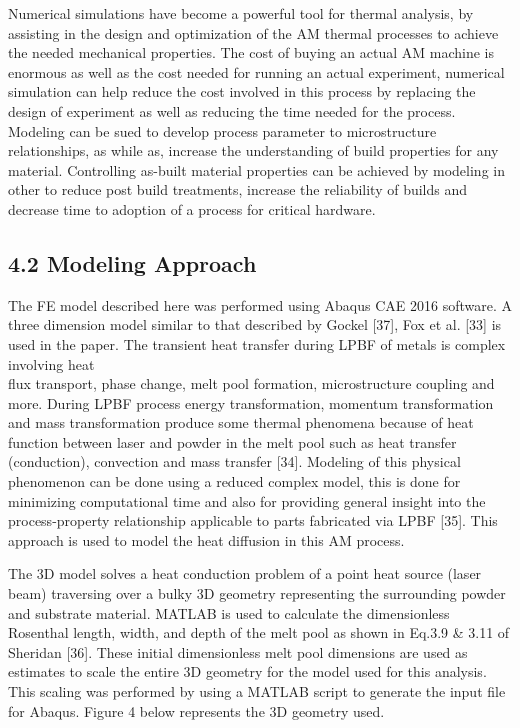 \documentclass[10pt]{article}
\begin{document}
Numerical simulations have become a powerful tool for thermal analysis, by assisting in the design and optimization of the AM thermal processes to achieve the needed mechanical properties. The cost of buying an actual AM machine is enormous as well as the cost needed for running an actual experiment, numerical simulation can help reduce the cost involved in this process by replacing the design of experiment as well as reducing the time needed for the process. Modeling can be sued to develop process parameter to microstructure relationships, as while as, increase the understanding of build properties for any material. Controlling as-built material properties can be achieved by modeling in other to reduce post build treatments, increase the reliability of builds and decrease time to adoption of a process for critical hardware.

\subsection*{4.2 Modeling Approach}
The FE model described here was performed using Abaqus CAE 2016 software. A three dimension model similar to that described by Gockel [37], Fox et al. [33] is used in the paper. The transient heat transfer during LPBF of metals is complex involving heat\\
flux transport, phase change, melt pool formation, microstructure coupling and more. During LPBF process energy transformation, momentum transformation and mass transformation produce some thermal phenomena because of heat function between laser and powder in the melt pool such as heat transfer (conduction), convection and mass transfer [34]. Modeling of this physical phenomenon can be done using a reduced complex model, this is done for minimizing computational time and also for providing general insight into the process-property relationship applicable to parts fabricated via LPBF [35]. This approach is used to model the heat diffusion in this AM process.

The 3D model solves a heat conduction problem of a point heat source (laser beam) traversing over a bulky 3D geometry representing the surrounding powder and substrate material. MATLAB is used to calculate the dimensionless Rosenthal length, width, and depth of the melt pool as shown in Eq.3.9 \& 3.11 of Sheridan [36]. These initial dimensionless melt pool dimensions are used as estimates to scale the entire 3D geometry for the model used for this analysis. This scaling was performed by using a MATLAB script to generate the input file for Abaqus. Figure 4 below represents the 3D geometry used.
\end{document}
